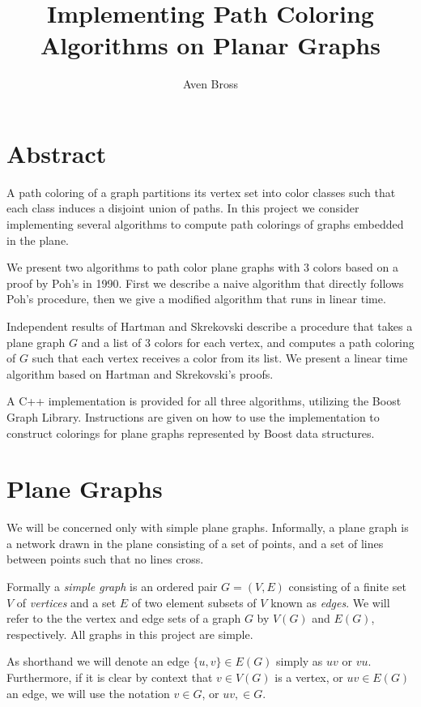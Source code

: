 \documentclass[letterpaper, 12pt]{article}
\title{Implementing Path Coloring Algorithms on Planar Graphs}
\author{Aven Bross}
\theoremstyle{definition}
\theoremstyle{definition}
\theoremstyle{thm}
\theoremstyle{definition}
\begin{document}
\maketitle

\section*{Abstract}
A path coloring of a graph partitions its vertex set into color classes such
that each class induces a disjoint union of paths. In this project we consider
implementing several algorithms to compute path colorings of graphs embedded in
the plane.

We present two algorithms to path color plane graphs with $3$ colors
based on a proof by Poh's in 1990. First we describe a naive algorithm that
directly follows Poh's procedure, then we give a modified algorithm
that runs in linear time.

Independent results of Hartman and Skrekovski describe a procedure that takes
a plane graph $G$ and a list of $3$ colors for each vertex, and
computes a path coloring of $G$ such that each vertex receives a color from its
list. We present a linear time algorithm based on Hartman and Skrekovski's
proofs.

A C++ implementation is provided for all three algorithms, utilizing the Boost
Graph Library. Instructions are given on how to use the implementation
to construct colorings for plane graphs represented by Boost data
structures.

\section{Plane Graphs}

We will be concerned only with simple plane graphs. Informally, a plane graph
is a network drawn in the plane consisting of a set of points, and a set of
lines between points such that no lines cross.

Formally a \textit{simple graph} is an ordered pair $G=(V,E)$ consisting of a finite set
$V$ of \textit{vertices} and a set $E$ of two element subsets of $V$ known as
\textit{edges}. We will refer to the the vertex and edge sets of a graph $G$ by
$V(G)$ and $E(G)$, respectively. All graphs in this project are simple.

As shorthand we will denote an edge $\{u,v\}\in E(G)$ simply as $uv$ or $vu$.
Furthermore, if it is clear by context that $v\in V(G)$ is a vertex, or $uv\in
E(G)$ an edge, we will use the notation $v\in G$, or $uv,\in G$.
\end{document}
